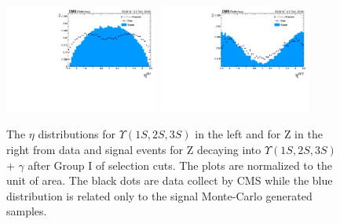 \begin{figure}[!htbp]
\begin{center}
\includegraphics[width=0.45\textwidth]{figures_and_tables/outputPlots/ZtoUpsilon_Cat0_ZZZZZ/au/data_x_mc/noKinCuts/h_noKin_Upsilon_eta}\hspace*{1.cm}
\includegraphics[width=0.45\textwidth]{figures_and_tables/outputPlots/ZtoUpsilon_Cat0_ZZZZZ/au/data_x_mc/noKinCuts/h_noKin_Z_eta}
\end{center}\vspace*{-.5cm}
\caption{The $\eta$ distributions for $\Upsilon(1S,2S,3S)$ in the left and for Z in the right from data and signal events for Z decaying into $\Upsilon(1S,2S,3S)$ + $\gamma$ after Group I of selection cuts. The plots are normalized to the unit of area. The black dots are data collect by CMS while the blue distribution is related only to the signal Monte-Carlo generated samples.}
\label{fig:etaUpsilon_and_Z_ZtoUpsilon_Cat0}
\end{figure}

